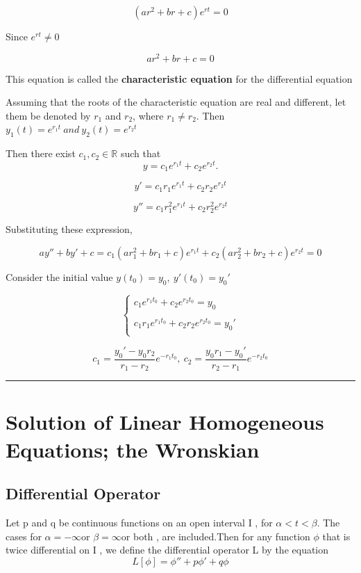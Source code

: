 \documentclass[12pt, a4paper]{article}
\theoremstyle{break}
\begin{document}
\[
(a r^2 + b r + c) e^{rt} = 0
\]

Since \(e^{rt} \neq 0\)

\[
a r^2 + b r  + c = 0
\]

This equation is called the \textbf{characteristic equation }for the differential equation

Assuming that the roots of the characteristic equation are real and different, let them be denoted by \(r_1\) and \(r_2\), where \(r_1 \neq r_2\). Then \(y_1(t) = e^{r_1 t} \ and \ y_2(t) = e ^{r_2 t}\)

Then there exist \(c_1,c_2\in\mathbb{R}\) such that
\[
y = c_1 e^{r_1t} + c_2 e^{r_2t}.
\]

\[
y' = c_1 r_1 e^{r_1 t} + c_2 r_2 e^{r_2 t}
\]

\[
y'' = c_1 r_1^2 e^{r_1 t} + c_2 r_2^2 e^{r_2 t}
\]

Substituting these expression,

\[
ay'' + by' + c = c_1 (ar_1^2 + b r_1 + c)e^{r_1 t} + c_2 (ar_2^2 + b r_2 + c)e^{r_2 t} = 0
\]

Consider the initial value \(y(t_0) = y_0 ,\ y'(t_0) = y_0'\)

\[
\begin{cases}c_1 e^{r_1t_0} + c_2 e ^{r_2t_0}  = y_0\\ \\ c_1 r_1 e^{r_1 t_0} + c_2 r_2 e^{r_2 t_0} = y_0'\\ \end{cases}
\]

\[
c_1 = \frac{y_0'-y_0 r_2}{r_1 - r_2}e^{-r_1t_0},\ c_2 = \frac{y_0r_1 - y_0'}{r_2 - r_1} e^{-r_2 t_0}
\]

\begin{center}\rule{0.5\linewidth}{0.5pt}\end{center}

\section{Solution of Linear Homogeneous Equations; the Wronskian}\label{solution-of-linear-homogeneous-equations-the-wronskian}

\subsection{Differential Operator}\label{differential-operator}

Let p and q be continuous functions on an open interval I , for \(\alpha < t < \beta\). The cases for \(\alpha  = -\infty\)or \(\beta = \infty\)or both , are included.Then for any function \(\phi\) that is twice differential on I , we define the differential operator L by the equation \[
  L[\phi] = \phi'' + p \phi' + q \phi 
  \]
\end{document}
